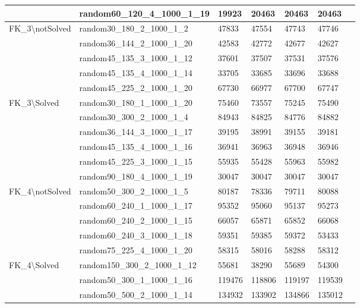 \begin{table}[!htbp]
{\begin{tabular}{@{}lllllll@{}}
            & random60\_120\_4\_1000\_1\_19 &19923   &20463  &20463  &20463 \\
            \midrule
            \multirow{5}{*}{FK\_3\textbackslash notSolved} 
            & random30\_180\_2\_1000\_1\_2 &47833 &47554  &47743  &47746  \\  
            & random36\_144\_2\_1000\_1\_20 &42583   &42772  &42677  &42627 \\  
            & random45\_135\_3\_1000\_1\_12 &37601   &37507  &37531  &37576 \\  
            & random45\_135\_4\_1000\_1\_14 &33705   &33685  &33696  &33688 \\  
            & random45\_225\_2\_1000\_1\_20 &67730  &66977  &67700  &67747 \\ 
            \midrule
            \multirow{6}{*}{FK\_3\textbackslash Solved}
            & random30\_180\_1\_1000\_1\_20 &75460  &73557  &75245  &75490 \\  
            & random30\_300\_2\_1000\_1\_4 &84943  &84825  &84776  &84882 \\  
            & random36\_144\_3\_1000\_1\_17 &39195  &38991  &39155  &39181 \\  
            & random45\_135\_4\_1000\_1\_16 &36941  &36963  &36948  &36946 \\  
            & random45\_225\_3\_1000\_1\_15 &55935  &55428  &55963  &55982 \\  
            & random90\_180\_4\_1000\_1\_19 &30047  &30047  &30047  &30047 \\  
            \midrule
            \multirow{5}{*}{FK\_4\textbackslash notSolved}
            & random50\_300\_2\_1000\_1\_5 &80187  &78336  &79711  &80088 \\  
            & random60\_240\_1\_1000\_1\_17 &95352  &95060  &95137  &95273 \\  
            & random60\_240\_2\_1000\_1\_15 &66057  &65871  &65852  &66068 \\  
            & random60\_240\_3\_1000\_1\_18 &59351  &59385  &59372  &53433 \\  
            & random75\_225\_4\_1000\_1\_20 &58315  &58016  &58288  &58312 \\ 
            \midrule
            \multirow{6}{*}{FK\_4\textbackslash Solved}
            & random150\_300\_2\_1000\_1\_12 &55681  &38290  &55689  &54300 \\  
            & random50\_300\_1\_1000\_1\_16 &119476   &118806  &119197  &119539 \\  
            & random50\_500\_2\_1000\_1\_14 &134932   &133902  &134866  &135012 \\  

\end{tabular}}
\end{table}
